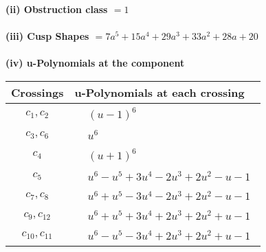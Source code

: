 \documentclass[1p]{elsarticle_modified}
\theoremstyle{definition}
\begin{document}
\flushleft \textbf{(ii) Obstruction class $= 1$}\\~\\
\flushleft \textbf{(iii) Cusp Shapes $= 7 a^5+15 a^4+29 a^3+33 a^2+28 a+20$}\\~\\
\newpage\renewcommand{\arraystretch}{1}
\flushleft \textbf{(iv) u-Polynomials at the component}\newline \\
\begin{tabular}{m{50pt}|m{274pt}}
Crossings & \hspace{64pt}u-Polynomials at each crossing \\
\hline $$\begin{aligned}c_{1},c_{2}\end{aligned}$$&$\begin{aligned}
&(u-1)^6
\end{aligned}$\\
\hline $$\begin{aligned}c_{3},c_{6}\end{aligned}$$&$\begin{aligned}
&u^6
\end{aligned}$\\
\hline $$\begin{aligned}c_{4}\end{aligned}$$&$\begin{aligned}
&(u+1)^6
\end{aligned}$\\
\hline $$\begin{aligned}c_{5}\end{aligned}$$&$\begin{aligned}
&u^6- u^5+3 u^4-2 u^3+2 u^2- u-1
\end{aligned}$\\
\hline $$\begin{aligned}c_{7},c_{8}\end{aligned}$$&$\begin{aligned}
&u^6+u^5-3 u^4-2 u^3+2 u^2- u-1
\end{aligned}$\\
\hline $$\begin{aligned}c_{9},c_{12}\end{aligned}$$&$\begin{aligned}
&u^6+u^5+3 u^4+2 u^3+2 u^2+u-1
\end{aligned}$\\
\hline $$\begin{aligned}c_{10},c_{11}\end{aligned}$$&$\begin{aligned}
&u^6- u^5-3 u^4+2 u^3+2 u^2+u-1
\end{aligned}$\\
\hline
\end{tabular}\\~\\
\end{document}

